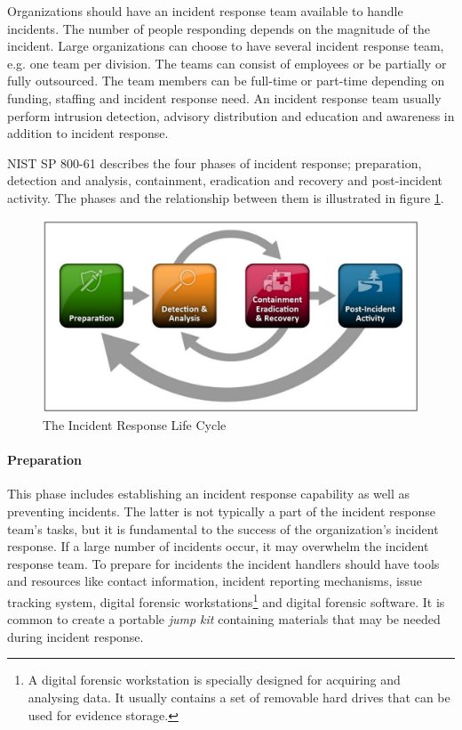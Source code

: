 Organizations should have an incident response team available to handle incidents. The number of people responding depends on the magnitude of the incident. Large organizations can choose to have several incident response team, e.g. one team per division. The teams can consist of employees or be partially or fully outsourced. The team members can be full-time or part-time depending on funding, staffing and incident response need.  %
An incident response team usually perform intrusion detection, advisory distribution and education and awareness in addition to incident response.

\acs{NIST} SP 800-61 describes the four phases of incident response; preparation, detection and analysis, containment, eradication and recovery and post-incident activity. The phases and the relationship between them is illustrated in figure \ref{fig:NISTIncidentResponse}.

\begin{figure}[ht]
\begin{center}
\includegraphics[scale=0.27]{NISTIncidentResponseCycle.png}
\caption[The Incident Response Life Cycle]{The Incident Response Life Cycle \cite{nist800-61}}
\label{fig:NISTIncidentResponse}
\end{center}
\end{figure}

\paragraph{Preparation} 
This phase includes establishing an incident response capability as well as preventing incidents. The latter is not typically a part of the incident response team's tasks, but it is fundamental to the success of the organization's incident response. If a large number of incidents occur, it may overwhelm the incident response team. To prepare for incidents the incident handlers should have tools and resources like contact information, incident reporting mechanisms, issue tracking system, digital forensic workstations\footnote{A digital forensic workstation is specially designed for acquiring and analysing data. It usually contains a set of removable hard drives that can be used for evidence storage.} and digital forensic software. It is common to create a portable \emph{jump kit} containing materials that may be needed during incident response.

